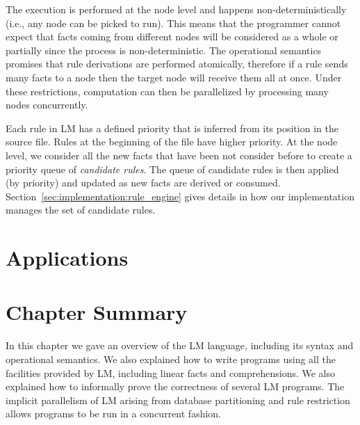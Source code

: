 The execution is performed at the node level and happens non-deterministically
(i.e., any node can be picked to run). This means that the programmer cannot
expect that facts coming from different nodes will be considered as a whole or
partially since the process is non-deterministic. The operational semantics
promises that rule derivations are performed atomically, therefore if a rule
sends many facts to a node then the target node will receive them all at once.
Under these restrictions, computation can then be parallelized by processing
many nodes concurrently.

Each rule in LM has a defined priority that is inferred from its position in the
source file.  Rules at the beginning of the file have higher priority. At the
node level, we consider all the new facts that have been not consider before to
create a priority queue of \emph{candidate rules}.  The queue of candidate rules
is then applied (by priority) and updated as new facts are derived or consumed.
Section~\ref{sec:implementation:rule_engine} gives details in how our
implementation manages the set of candidate rules.

\section{Applications}


\section{Chapter Summary}

In this chapter we gave an overview of the LM language, including its syntax and
operational semantics.  We also explained how to write programs using all the
facilities provided by LM, including linear facts and comprehensions. We also
explained how to informally prove the correctness of several LM programs.  The implicit
parallelism of LM arising from database partitioning and rule restriction allows
programs to be run in a concurrent fashion.
